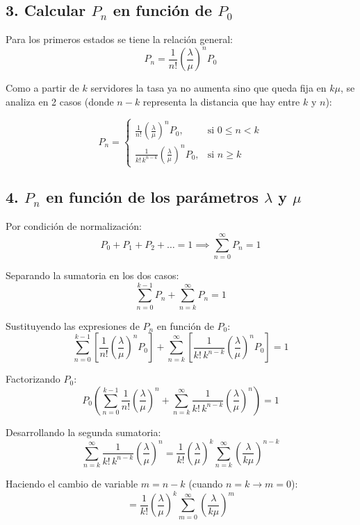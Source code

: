 \documentclass[12pt]{article}
\begin{document}
\subsection*{3. Calcular $P_n$ en función de $P_0$}

Para los primeros estados se tiene la relación general:
\[
P_n = \frac{1}{n!} \left( \frac{\lambda}{\mu} \right)^n P_0
\]

Como a partir de $k$ servidores la tasa ya no aumenta sino que queda fija en $k\mu$, se analiza en 2 casos (donde $n-k$ representa la distancia que hay entre $k$ y $n$):

\[
P_n = 
\begin{cases} 
\displaystyle \frac{1}{n!} \left( \frac{\lambda}{\mu} \right)^n P_0, & \text{si } 0 \le n < k \\[1.5em]
\displaystyle \frac{1}{k! \, k^{n-k}} \left( \frac{\lambda}{\mu} \right)^n P_0, & \text{si } n \ge k 
\end{cases}
\]

\subsection*{4. $P_n$ en función de los parámetros $\lambda$ y $\mu$}

Por condición de normalización:
\[
P_0 + P_1 + P_2 + \dots = 1 \implies \sum_{n=0}^{\infty} P_n = 1
\]

Separando la sumatoria en los dos casos:
\[
\sum_{n=0}^{k-1} P_n + \sum_{n=k}^{\infty} P_n = 1
\]

Sustituyendo las expresiones de $P_n$ en función de $P_0$:
\[
\sum_{n=0}^{k-1} \left[ \frac{1}{n!} \left( \frac{\lambda}{\mu} \right)^n P_0 \right] + \sum_{n=k}^{\infty} \left[ \frac{1}{k! \, k^{n-k}} \left( \frac{\lambda}{\mu} \right)^n P_0 \right] = 1
\]

Factorizando $P_0$:
\[
P_0 \left( \sum_{n=0}^{k-1} \frac{1}{n!} \left( \frac{\lambda}{\mu} \right)^n + \sum_{n=k}^{\infty} \frac{1}{k! \, k^{n-k}} \left( \frac{\lambda}{\mu} \right)^n \right) = 1
\]

Desarrollando la segunda sumatoria:
\[
\sum_{n=k}^{\infty} \frac{1}{k! \, k^{n-k}} \left( \frac{\lambda}{\mu} \right)^n = \frac{1}{k!} \left( \frac{\lambda}{\mu} \right)^k \sum_{n=k}^{\infty} \left( \frac{\lambda}{k\mu} \right)^{n-k}
\]

Haciendo el cambio de variable $m = n - k$ (cuando $n = k \to m = 0$):
\[
= \frac{1}{k!} \left( \frac{\lambda}{\mu} \right)^k \sum_{m=0}^{\infty} \left( \frac{\lambda}{k\mu} \right)^m
\]
\end{document}
